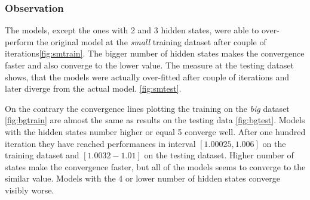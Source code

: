 \documentclass[thesis=M,english]{FITthesis}[2012/10/20]
\begin{document}
\subsubsection*{ Observation }

The models, except the ones with 2 and 3 hidden states, were able to over-perform the original model at the \textit{small} training dataset after couple of iterations\ref{fig:smtrain}. The bigger number of hidden states makes the convergence faster and also converge to the lower value. The measure at the testing dataset shows, that the models were actually over-fitted after couple of iterations and later diverge from the actual model. \ref{fig:smtest}. 

On the contrary the convergence lines plotting the training on the \textit{big} dataset \ref{fig:bgtrain} are almost the same as results on the testing data \ref{fig:bgtest}. Models with the hidden states number higher or equal 5 converge well. After one hundred iteration they have reached performances in interval $[1.00025,1.006]$ on the training dataset and $[1.0032-1.01]$ on the testing dataset. Higher number of states make the convergence faster, but all of the models seems to converge to the similar value. Models with the 4 or lower number of hidden states converge visibly worse. 
\end{document}
